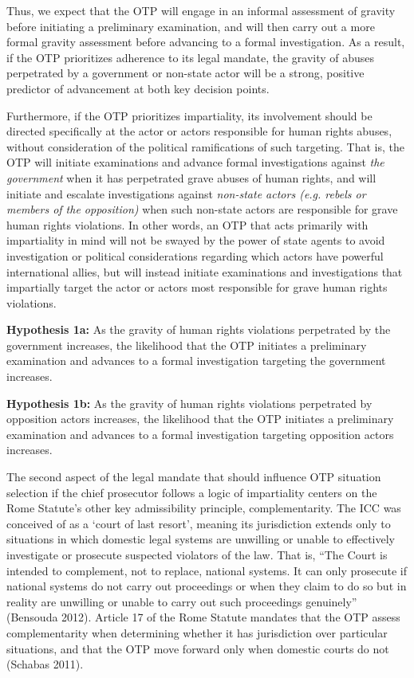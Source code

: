 Thus, we expect that the OTP will engage in an informal assessment of gravity before initiating a preliminary examination, and will then carry out a more formal gravity assessment before advancing to a formal investigation. As a result, if the OTP prioritizes adherence to its legal mandate, the gravity of abuses perpetrated by a government or non-state actor will be a strong, positive predictor of advancement at both key decision points.

Furthermore, if the OTP prioritizes impartiality, its involvement should be directed specifically at the actor or actors responsible for human rights abuses, without consideration of the political ramifications of such targeting. That is, the OTP will initiate examinations and advance formal investigations against \emph{the government} when it has perpetrated grave abuses of human rights, and will initiate and escalate investigations against \emph{non-state actors (e.g. rebels or members of the opposition)} when such non-state actors are responsible for grave human rights violations. In other words, an OTP that acts primarily with impartiality in mind will not be swayed by the power of state agents to avoid investigation or political considerations regarding which actors have powerful international allies, but will instead initiate examinations and investigations that impartially target the actor or actors most responsible for grave human rights violations.

\textbf{Hypothesis 1a:} As the gravity of human rights violations perpetrated by the government increases, the likelihood that the OTP initiates a preliminary examination and advances to a formal investigation targeting the government increases.

\textbf{Hypothesis 1b:} As the gravity of human rights violations perpetrated by opposition actors increases, the likelihood that the OTP initiates a preliminary examination and advances to a formal investigation targeting opposition actors increases.

The second aspect of the legal mandate that should influence OTP situation selection if the chief prosecutor follows a logic of impartiality centers on the Rome Statute's other key admissibility principle, complementarity. The ICC was conceived of as a `court of last resort', meaning its jurisdiction extends only to situations in which domestic legal systems are unwilling or unable to effectively investigate or prosecute suspected violators of the law. That is, ``The Court is intended to complement, not to replace, national systems. It can only prosecute if national systems do not carry out proceedings or when they claim to do so but in reality are unwilling or unable to carry out such proceedings genuinely'' (Bensouda 2012). Article 17 of the Rome Statute mandates that the OTP assess complementarity when determining whether it has jurisdiction over particular situations, and that the OTP move forward only when domestic courts do not (Schabas 2011).

